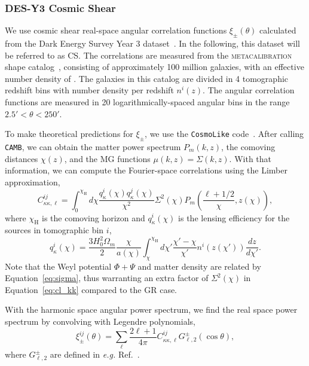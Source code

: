 \documentclass[%
reprint,
superscriptaddress,
preprint numbers,
nofootinbib,
amsmath,amssymb,
aps,
prd
]{revtex4-2}
\begin{document}
\subsubsection{DES-Y3 Cosmic Shear}

We use cosmic shear real-space angular correlation functions $\xi_\pm(\theta)$ calculated from the Dark Energy Survey Year 3 dataset~\cite{des_y3_shear_amon, des_y3_shear_secco}. In the following, this dataset will be referred to as CS. The correlations are measured from the \textsc{metacalibration} shape catalog~\cite{des_y3_metacal}, consisting of approximately 100 million galaxies, with an effective number density of . The galaxies in this catalog are divided in 4 tomographic redshift bins with number density per redshift $n^i(z)$. The angular correlation functions are measured in 20 logarithmically-spaced angular bins in the range $2.5' < \theta < 250'$.

To make theoretical predictions for $\xi_\pm$, we use the \texttt{CosmoLike} code~\cite{cosmolike}. After calling \texttt{CAMB}, we can obtain the matter power spectrum $P_m(k, z)$, the comoving distances $\chi(z)$, and the MG functions $\mu(k, z) = \Sigma(k, z)$.  With that information, we can compute the Fourier-space correlations using the Limber approximation,
\begin{equation}\label{eq:cl_kk}
    C_{\kappa\kappa, \ell}^{ij} = \int_0^{\chi_\mathrm{H}} d\chi \frac{q^i_\kappa(\chi)q^j_\kappa(\chi)}{\chi^2}\Sigma^2(\chi)P_m \left( \frac{\ell + 1/2}{\chi}, z(\chi) \right),
\end{equation}
where $\chi_\mathrm{H}$ is the comoving horizon and $q^i_\kappa(\chi)$ is the lensing efficiency for the sources in tomographic bin $i$,
\begin{equation}
    q^i_\kappa(\chi) = \frac{3H_0^2\Omega_m}{2}\frac{\chi}{a(\chi)}\int_\chi^{\chi_\mathrm{H}} d\chi' \frac{\chi' - \chi}{\chi'}n^i(z(\chi'))\frac{dz}{d\chi'}.
\end{equation}
Note that the Weyl potential $\Phi + \Psi$ and matter density are related by Equation~\ref{eq:sigma}, thus warranting an extra factor of $\Sigma^2(\chi)$ in Equation~\ref{eq:cl_kk} compared to the GR case.

With the harmonic space angular power spectrum, we find the real space power spectrum by convolving with Legendre polynomials,
\begin{equation}
    \xi_\pm^{ij}(\theta) = \sum_\ell \frac{2\ell + 1}{4\pi}C_{\kappa\kappa, \ell}^{ij} G_{\ell,2}^{\pm}(\cos\theta),
\end{equation}
where $G^{\pm}_{\ell,2}$ are defined in \textit{e.g.} Ref.~\cite{stebbins}.
\end{document}
